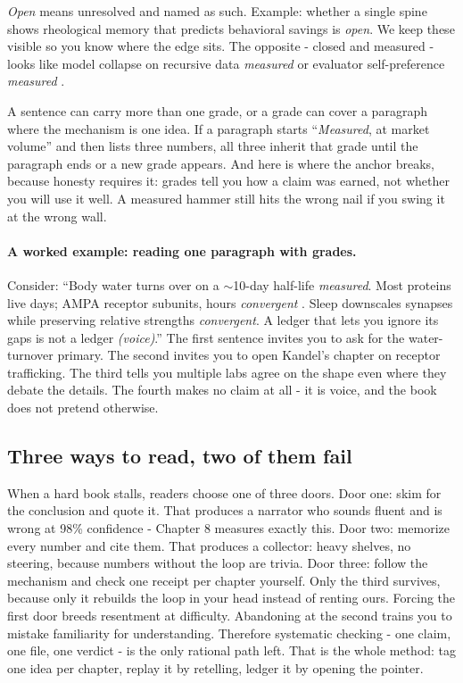 \textit{Open} means unresolved and named as such. Example: whether a single spine shows rheological memory that predicts behavioral savings is \textit{open}. We keep these visible so you know where the edge sits. The opposite - closed and measured - looks like model collapse on recursive data \textit{measured} \citep{shumailov2024} or evaluator self-preference \textit{measured} \citep{panickssery2024}.

A sentence can carry more than one grade, or a grade can cover a paragraph where the mechanism is one idea. If a paragraph starts ``\textit{Measured}, at market volume'' and then lists three numbers, all three inherit that grade until the paragraph ends or a new grade appears. And here is where the anchor breaks, because honesty requires it: grades tell you how a claim was earned, not whether you will use it well. A measured hammer still hits the wrong nail if you swing it at the wrong wall.

\paragraph{A worked example: reading one paragraph with grades.}
Consider: ``Body water turns over on a $\sim$10-day half-life \textit{measured}. Most proteins live days; AMPA receptor subunits, hours \textit{convergent} \citep{kandel2000}. Sleep downscales synapses while preserving relative strengths \textit{convergent}. A ledger that lets you ignore its gaps is not a ledger \textit{(voice)}.'' The first sentence invites you to ask for the water-turnover primary. The second invites you to open Kandel's chapter on receptor trafficking. The third tells you multiple labs agree on the shape even where they debate the details. The fourth makes no claim at all - it is voice, and the book does not pretend otherwise.

\subsection*{Three ways to read, two of them fail}

When a hard book stalls, readers choose one of three doors. Door one: skim for the conclusion and quote it. That produces a narrator who sounds fluent and is wrong at 98\% confidence - Chapter 8 measures exactly this. Door two: memorize every number and cite them. That produces a collector: heavy shelves, no steering, because numbers without the loop are trivia. Door three: follow the mechanism and check one receipt per chapter yourself. Only the third survives, because only it rebuilds the loop in your head instead of renting ours. Forcing the first door breeds resentment at difficulty. Abandoning at the second trains you to mistake familiarity for understanding. Therefore systematic checking - one claim, one file, one verdict - is the only rational path left. That is the whole method: tag one idea per chapter, replay it by retelling, ledger it by opening the pointer.

